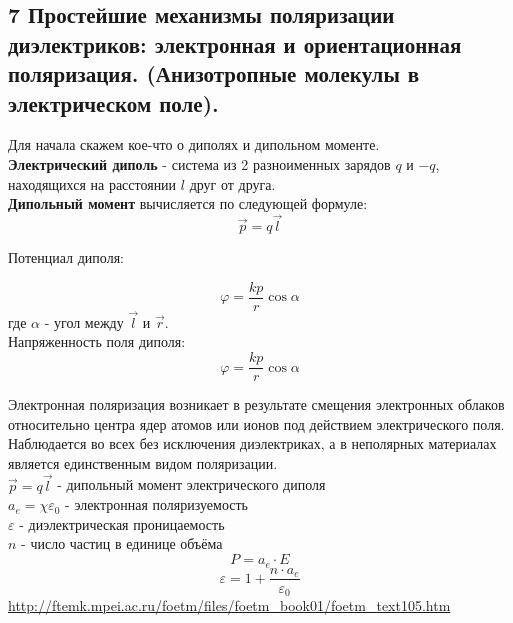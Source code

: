 \documentclass[a4paper,12pt]{article}
\begin{document}
\subsection{7   Простейшие механизмы поляризации диэлектриков: электронная и ориентационная поляризация. (Анизотропные молекулы в электрическом поле).}
Для начала скажем кое-что о диполях и дипольном моменте. \\
\textbf{Электрический диполь} - система из 2 разноименных зарядов $ q $ и $ -q $, находящихся на расстоянии $ l $ друг от друга. \\
\textbf{Дипольный момент} вычисляется по следующей формуле:
\begin{equation}
	\vec{p} = q \vec{l}
\end{equation}

Потенциал диполя:

\begin{equation}
	\varphi = \frac {k p} {r} \cos {\alpha}
\end{equation}
где $ \alpha $ - угол между $ \vec{l} $ и $ \vec{r} $. \\

Напряженность поля диполя:
\begin{equation}
	\varphi = \frac {k p} {r} \cos {\alpha}
\end{equation}

Электронная поляризация возникает в результате смещения электронных облаков относительно центра ядер атомов или ионов под действием электрического поля. Наблюдается во всех без исключения диэлектриках, а в неполярных материалах является единственным видом поляризации.\\
$\vec{p} = q\vec{l}$ - дипольный момент электрического диполя\\
$a_e = \chi \varepsilon_0$ - электронная поляризуемость\\
$\varepsilon$ - диэлектрическая проницаемость\\
$n$ - число частиц в единице объёма\\
\begin{equation}
	P = a_e \cdot E
\end{equation}
\begin{equation}
	\varepsilon = 1 + \frac{n \cdot a_e}{\varepsilon _0}
\end{equation}
\url{http://ftemk.mpei.ac.ru/foetm/files/foetm_book01/foetm_text105.htm}
\end{document}
